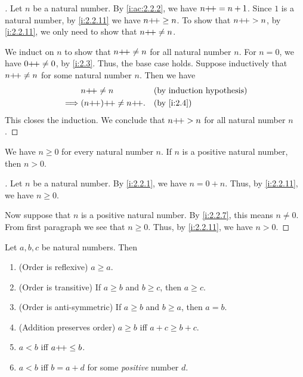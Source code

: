 \begin{proof}[]
  Let \(n\) be a natural number.
  By \cref{i:ac:2.2.2}, we have \(n{+}\!{+} = n + 1\).
  Since \(1\) is a natural number, by \cref{i:2.2.11} we have \(n{+}\!{+} \geq n\).
  To show that \(n{+}\!{+} > n\), by \cref{i:2.2.11}, we only need to show that \(n{+}\!{+} \neq n\).

  We induct on \(n\) to show that \(n{+}\!{+} \neq n\) for all natural number \(n\).
  For \(n = 0\), we have \(0{+}\!{+} \neq 0\), by \cref{i:2.3}.
  Thus, the base case holds.
  Suppose inductively that \(n{+}\!{+} \neq n\) for some natural number \(n\).
  Then we have
  \begin{align*}
             & n\pp \neq n          &  & \byIH      \\
    \implies & (n\pp)\pp \neq n\pp. &  & \by{i:2.4}
  \end{align*}
  This closes the induction.
  We conclude that \(n{+}\!{+} > n\) for all natural number \(n\).
\end{proof}

\begin{ac}\label{i:ac:2.2.4}
  We have \(n \geq 0\) for every natural number \(n\).
  If \(n\) is a positive natural number, then \(n > 0\).
\end{ac}

\begin{proof}[]
  Let \(n\) be a natural number.
  By \cref{i:2.2.1}, we have \(n = 0 + n\).
  Thus, by \cref{i:2.2.11}, we have \(n \geq 0\).

  Now suppose that \(n\) is a positive natural number.
  By \cref{i:2.2.7}, this means \(n \neq 0\).
  From first paragraph we see that \(n \geq 0\).
  Thus, by \cref{i:2.2.11}, we have \(n > 0\).
\end{proof}

\begin{prop}\label{i:2.2.12}
  Let \(a, b, c\) be natural numbers.
  Then
  \begin{enumerate}
    \item (Order is reflexive) \(a \geq a\).
    \item (Order is transitive) If \(a \geq b\) and \(b \geq c\), then \(a \geq c\).
    \item (Order is anti-symmetric) If \(a \geq b\) and \(b \geq a\), then \(a = b\).
    \item (Addition preserves order) \(a \geq b\) iff \(a + c \geq b + c\).
    \item \(a < b\) iff \(a{+}\!{+} \leq b\).
    \item \(a < b\) iff \(b = a + d\) for some \emph{positive} number \(d\).
  \end{enumerate}
\end{prop}

